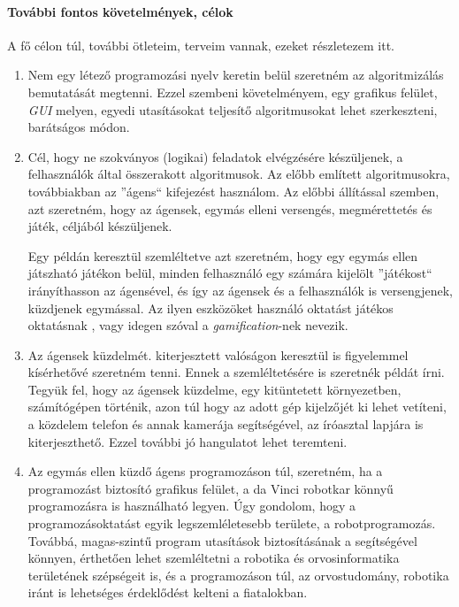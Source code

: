 \documentclass[12pt,a4paper,oneside]{report} %
\begin{document}
\paragraph{További fontos követelmények, célok}
A fő célon túl, további ötleteim, terveim vannak, ezeket részletezem itt.
\begin{enumerate}
	\item Nem egy létező programozási nyelv keretin belül szeretném  az algoritmizálás bemutatását megtenni. Ezzel szembeni követelményem, egy grafikus felület, \textit{GUI} melyen, egyedi utasításokat teljesítő algoritmusokat lehet szerkeszteni, barátságos módon.
	\item Cél, hogy ne szokványos (logikai) feladatok elvégzésére készüljenek, a felhasználók által összerakott algoritmusok. Az előbb említett algoritmusokra, továbbiakban az ''ágens`` kifejezést használom. Az előbbi állítással szemben, azt szeretném, hogy az ágensek,  egymás elleni versengés, megmérettetés és játék, céljából készüljenek.
	\par Egy példán keresztül szemléltetve azt szeretném, hogy egy egymás ellen játszható játékon belül, minden felhasználó egy számára kijelölt ''játékost`` irányíthasson az ágensével, és így az ágensek és a felhasználók is versengjenek, küzdjenek egymással. Az ilyen eszközöket használó oktatást játékos oktatásnak  \cite{riar2020game}, vagy idegen szóval a \textit{gamification}-nek \cite{Deterding2011} nevezik. 
	\item Az ágensek küzdelmét. kiterjesztett valóságon keresztül is figyelemmel kísérhetővé szeretném tenni. Ennek a szemléltetésére is szeretnék példát írni. Tegyük fel, hogy  az ágensek küzdelme, egy kitüntetett környezetben, számítógépen történik, azon túl hogy az adott gép kijelzőjét ki lehet vetíteni, a közdelem telefon és annak kamerája segítségével, az íróasztal lapjára is kiterjeszthető. Ezzel további jó hangulatot lehet teremteni.
	\item Az egymás ellen küzdő ágens programozáson túl, szeretném, ha a programozást biztosító grafikus felület, a da Vinci robotkar könnyű programozásra is használható legyen. Úgy gondolom, hogy a programozásoktatást egyik legszemléletesebb területe, a robotprogramozás. Továbbá, magas-szintű program utasítások biztosításának a segítségével könnyen, érthetően lehet szemléltetni a robotika és orvosinformatika területének szépségeit is, és a programozáson túl, az orvostudomány, robotika iránt is  lehetséges érdeklődést kelteni a fiatalokban.
\end{enumerate}
\end{document}
